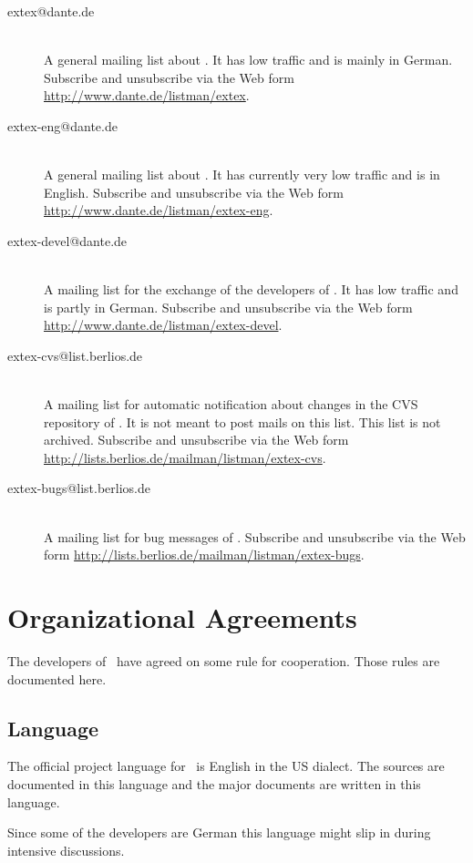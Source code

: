 \begin{description}
\item[extex@dante.de] \ \\
  A general mailing list about \ExTeX. It has low traffic and is
  mainly in German. Subscribe and unsubscribe via the Web form
  \url{http://www.dante.de/listman/extex}.
\item[extex-eng@dante.de] \ \\
  A general mailing list about \ExTeX. It has currently very low
  traffic and is in English. Subscribe and unsubscribe via the Web
  form \url{http://www.dante.de/listman/extex-eng}.
\item[extex-devel@dante.de] \ \\
  A mailing list for the exchange of the developers of \ExTeX. It has
  low traffic and is partly in German. Subscribe and unsubscribe via
  the Web form \url{http://www.dante.de/listman/extex-devel}.
\item[extex-cvs@list.berlios.de] \ \\
  A mailing list for automatic notification about changes in the CVS
  repository of \ExTeX. It is not meant to post mails on this list.
  This list is not archived. Subscribe and unsubscribe via the Web
  form \url{http://lists.berlios.de/mailman/listman/extex-cvs}.
\item[extex-bugs@list.berlios.de] \ \\
  A mailing list for bug messages of \ExTeX. Subscribe and unsubscribe
  via the Web form
  \url{http://lists.berlios.de/mailman/listman/extex-bugs}.
\end{description}


\section{Organizational Agreements}

The developers of \ExTeX\ have agreed on some rule for cooperation.
Those rules are documented here.

\subsection{Language}

The official project language for \ExTeX\ is English in the US
dialect. The sources are documented in this language and the major
documents are written in this language.

Since some of the developers are German this language might slip in
during intensive discussions.


